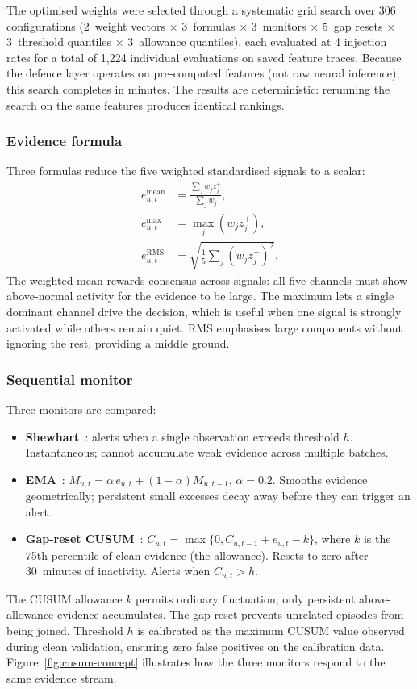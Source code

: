 \documentclass[10pt,twocolumn]{article}
\begin{document}
The optimised weights were selected through a systematic grid search over
306 configurations (2~weight vectors $\times$ 3~formulas $\times$
3~monitors $\times$ 5~gap resets $\times$ 3~threshold quantiles $\times$
3~allowance quantiles), each evaluated at 4 injection rates for a total of
1,224 individual evaluations on saved feature traces.  Because the defence layer operates on pre-computed features
(not raw neural inference), this search completes in
minutes.  The results are deterministic: rerunning the search on the same
features produces identical rankings.

\subsubsection{Evidence formula}

Three formulas reduce the five weighted standardised signals to a scalar:
\begin{align}
  e^{\mathrm{mean}}_{u,t} &= \frac{\sum_j w_j z_j^+}{\sum_j w_j},
  \label{eq:mean} \\
  e^{\mathrm{max}}_{u,t} &= \max_j\!\left(w_j z_j^+\right),
  \label{eq:max} \\
  e^{\mathrm{RMS}}_{u,t} &= \sqrt{\tfrac{1}{5}\sum_j
    \left(w_j z_j^+\right)^2}.
  \label{eq:rms}
\end{align}
The weighted mean rewards consensus across signals: all five channels must
show above-normal activity for the evidence to be large.  The maximum lets
a single dominant channel drive the decision, which is useful when one
signal is strongly activated while others remain quiet.  RMS emphasises
large components without ignoring the rest, providing a middle ground.

\subsubsection{Sequential monitor}

Three monitors are compared:
\begin{itemize}
  \item \textbf{Shewhart}~\cite{shewhart1931}: alerts when a single observation exceeds
    threshold $h$.  Instantaneous; cannot accumulate weak evidence across
    multiple batches.
  \item \textbf{EMA}~\cite{roberts1959ewma}: $M_{u,t}=\alpha\,e_{u,t}+(1-\alpha)M_{u,t-1}$,
    $\alpha=0.2$.  Smooths evidence geometrically; persistent small
    excesses decay away before they can trigger an alert.
  \item \textbf{Gap-reset CUSUM}~\cite{page1954cusum}:
    $C_{u,t}=\max\{0,C_{u,t-1}+e_{u,t}-k\}$, where $k$ is the 75th
    percentile of clean evidence (the allowance).  Resets to zero after
    30~minutes of inactivity.  Alerts when $C_{u,t}>h$.
\end{itemize}
The CUSUM allowance $k$ permits ordinary fluctuation; only persistent
above-allowance evidence accumulates.  The gap reset prevents unrelated
episodes from being joined.  Threshold $h$ is calibrated as the maximum
CUSUM value observed during clean validation, ensuring zero false positives
on the calibration data.  Figure~\ref{fig:cusum-concept} illustrates how
the three monitors respond to the same evidence stream.
\end{document}
